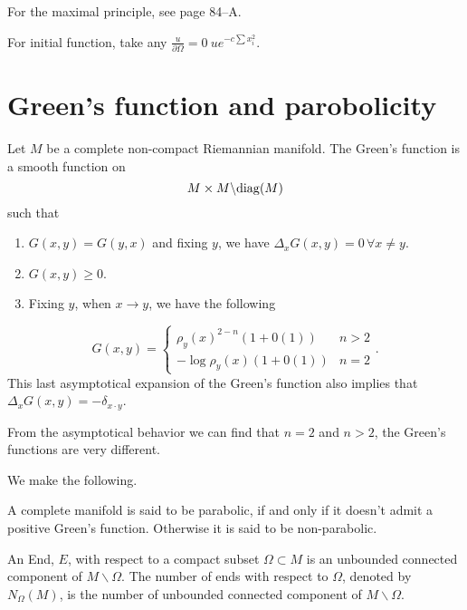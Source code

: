 For the maximal principle, see page 84--A. 

For initial function, take any $ \frac{u}{\partial \Omega } = 0 \   u e ^{- c \sum x_i ^2}$.








\section{Green's function and parobolicity}

Let $M$ be a complete non-compact Riemannian manifold. The Green's function is a smooth function on 
\[ M \times M  \backslash {\rm diag} (M) \]
%
such that 
%
\begin{enumerate}
\item $G (x, y)   =   G (y, x) $ and fixing $ y$, we have $ \Delta _x G (x, y)  = 0 \, \forall x \neq y $. 
\item $G(x, y) \geq 0 $.
\item Fixing $y$, when $ x \rightarrow y$, we have the following 
  \end{enumerate} 
%
\[ G(x, y) = \left\{ \begin{array}{ll} \rho _y (x) ^{2-n} (1 + 0(1) )& n>2 \\
- \log \rho_y (x) (1 + 0(1)) & n = 2 \end{array} \right. .\]
%
This last asymptotical expansion of the Green's function also implies that $ \Delta _x G(x, y) = - \delta _{x \cdot y} $.

From the asymptotical behavior we can find that $ n = 2$ and $ n> 2$, the Green's functions are very different.

We make the following.

\begin{definition} A complete manifold is said to be parabolic, if and only if it doesn't admit a positive Green's function. Otherwise it is said to be non-parabolic.
\end{definition}

\begin{definition}
An End, $E$, with respect to a compact subset $ \Omega \subset M  $ is an unbounded connected  component of $ M \backslash \Omega $. The number of ends with respect to $ \Omega $, denoted by $ N_{\Omega}(M)$, is the number of unbounded connected component of $ M \backslash \Omega $.
\end{definition}

